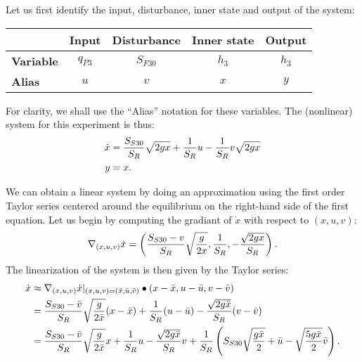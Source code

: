 \documentclass[a4paper,11pt]{article}
\newcommand{\equil}[1]{\bar{#1}}
\begin{document}
Let us first identify the input, disturbance, inner state and output of the system:
\begin{center}
\begin{tabular}{lcccc}
    & \textbf{Input} & \textbf{Disturbance} & \textbf{Inner state} & \textbf{Output} \\
    \hline
    \textbf{Variable} & $q_{P3}$ & $S_{F30}$ & $h_3$ & $h_3$ \\
    \hline
    \textbf{Alias} & $u$ & $v$ & $x$ & $y$
\end{tabular}
\end{center}
For clarity, we shall use the ``Alias'' notation for these variables. The (nonlinear) system for this experiment is thus:
\begin{align*}
    \dot{x} &= \frac{S_{S30}}{S_R} \sqrt{2gx} + \frac{1}{S_R} u - \frac{1}{S_R} v \sqrt{2gx} \\
    y &= x
    \text.
\end{align*}

We can obtain a linear system by doing an approximation using the first order Taylor series centered around the equilibrium on the right-hand side of the first equation. Let us begin by computing the gradiant of $\dot{x}$ with respect to $(x, u, v)$:
\[
    \nabla_{(x, u, v)}\dot{x} = \left(
        \frac{S_{S30} - v}{S_R} \sqrt{\frac{g}{2x}},
        \frac{1}{S_R},
        - \frac{\sqrt{2gx}}{S_R}
    \right)
    \text.
\]
The linearization of the system is then given by the Taylor series:
\begin{align*}
    \dot{x}
    &\approx \nabla_{(x, u, v)}\dot{x}\rvert_{(x,u,v) = (\equil{x},\equil{u},\equil{v})} \bullet (x -\equil{x},u - \equil{u},v - \equil{v}) \\
    &= \frac{S_{S30} - \equil{v}}{S_R} \sqrt{\frac{g}{2\equil{x}}} (x - \equil{x})
     + \frac{1}{S_R} (u - \equil{u})
     - \frac{\sqrt{2g\equil{x}}}{S_R} (v - \equil{v}) \\
    &= \frac{S_{S30} - \equil{v}}{S_R} \sqrt{\frac{g}{2\equil{x}}} x
     + \frac{1}{S_R} u - \frac{\sqrt{2g\equil{x}}}{S_R} v
     + \frac{1}{S_R} \left( S_{S30} \sqrt{\frac{g\equil{x}}{2}}
     + \equil{u}
     - \sqrt{\frac{5g\equil{x}}{2}} \equil{v} \right)
    \text.
\end{align*}
\end{document}

